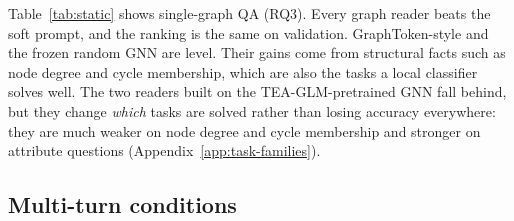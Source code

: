 \documentclass[11pt]{article}
\begin{document}
Table~\ref{tab:static} shows single-graph QA (RQ3).
Every graph reader beats the soft prompt, and the ranking is the same on validation.
GraphToken-style and the frozen random GNN are level.
Their gains come from structural facts such as node degree and cycle membership, which are also the tasks a local classifier solves well.
The two readers built on the TEA-GLM-pretrained GNN fall behind, but they change \emph{which} tasks are solved rather than losing accuracy everywhere: they are much weaker on node degree and cycle membership and stronger on attribute questions (Appendix~\ref{app:task-families}).

\subsection{Multi-turn conditions}
\label{sec:conditions}

\begin{table}[t]
\centering
\small
{}
\caption{Multi-turn test accuracy (\%), 4{,}455 turns. GT and TEA are means over three seeds (seed s.d.\ of the oracle row: 0.2 and 0.4). Rows below the first rule do not depend on the graph reader. The stale oracle is perfect on unchanged turns and scores 0\% on answer-changing ones, so it is a reference, not a competitor (Appendix~\ref{app:stale}).}
\label{tab:conditions}
\end{table}
\end{document}
